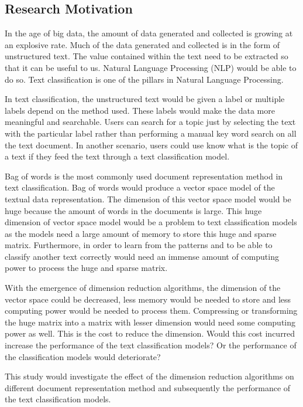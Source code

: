 \clearpage
\subsection{Research Motivation}
In the age of big data, the amount of data generated and collected is growing at an explosive rate. Much of the data generated and collected is in the form of unstructured text. The value contained within the text need to be extracted so that it can be useful to us. Natural Language Processing (NLP) would be able to do so. Text classification is one of the pillars in Natural Language Processing.

In text classification, the unstructured text would be given a label or multiple labels depend on the method used. These labels would make the data more meaningful and searchable. Users can search for a topic just by selecting the text with the particular label rather than performing a manual key word search on all the text document. In another scenario, users could use know what is the topic of a text if they feed the text through a text classification model.

Bag of words is the most commonly used document representation method in text classification. Bag of words would produce a vector space model of the textual data representation. The dimension of this vector space model would be huge because the amount of words in the documents is large. This huge dimension of vector space model would be a problem to text classification models as the models need a large amount of memory to store this huge and sparse matrix. Furthermore, in order to learn from the patterns and to be able to classify another text correctly would need an immense amount of computing power to process the huge and sparse matrix.

With the emergence of dimension reduction algorithms, the dimension of the vector space could be decreased, less memory would be needed to store and less computing power would be needed to process them. Compressing or transforming the huge matrix into a matrix with lesser dimension would need some computing power as well. This is the cost to reduce the dimension. Would this cost incurred increase the performance of the text classification models? Or the performance of the classification models would deteriorate?

This study would investigate the effect of the dimension reduction algorithms on different document representation method and subsequently the performance of the text classification models.\\

